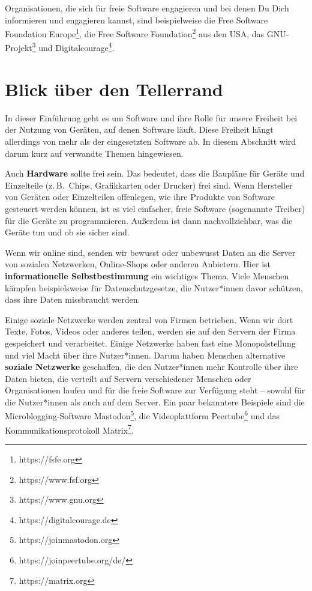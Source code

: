 \documentclass[a5paper,12pt]{scrartcl}
\begin{document}
Organisationen, die sich für freie Software engagieren und bei denen
Du Dich informieren und engagieren kannst, sind beispielweise die Free
Software Foundation Europe\footnote{https://fsfe.org}, die Free
Software Foundation\footnote{https://www.fsf.org} aus den USA, das
GNU-Projekt\footnote{https://www.gnu.org} und
Digitalcourage\footnote{https://digitalcourage.de}.


\section{Blick über den Tellerrand}

In dieser Einführung geht es um Software und ihre Rolle für unsere
Freiheit bei der Nutzung von Geräten, auf denen Software läuft. Diese
Freiheit hängt allerdings von mehr als der eingesetzten Software
ab. In diesem Abschnitt wird darum kurz auf verwandte Themen
hingewiesen.

Auch \textbf{Hardware} sollte frei sein. Das bedeutet, dass die
Baupläne für Geräte und Einzelteile (z.\,B.\ Chips, Grafikkarten oder
Drucker) frei sind. Wenn Hersteller von Geräten oder Einzelteilen
offenlegen, wie ihre Produkte von Software gesteuert werden können,
ist es viel einfacher, freie Software (sogenannte Treiber) für die
Geräte zu programmieren. Außerdem ist dann nachvollziehbar, was die
Geräte tun und ob sie sicher sind.

Wenn wir online sind, senden wir bewusst oder unbewusst Daten an die
Server von sozialen Netzwerken, Online-Shops oder anderen
Anbietern. Hier ist \textbf{informationelle Selbstbestimmung} ein
wichtiges Thema. Viele Menschen kämpfen beispielsweise für
Datenschutzgesetze, die Nutzer*innen davor schützen, dass ihre Daten
missbraucht werden.

Einige soziale Netzwerke werden zentral von Firmen betrieben. Wenn wir
dort Texte, Fotos, Videos oder anderes teilen, werden sie auf den
Servern der Firma gespeichert und verarbeitet. Einige Netzwerke haben
fast eine Monopolstellung und viel Macht über ihre Nutzer*innen. Darum
haben Menschen alternative \textbf{soziale Netzwerke} geschaffen, die
den Nutzer*innen mehr Kontrolle über ihre Daten bieten, die verteilt
auf Servern verschiedener Menschen oder Organisationen laufen und für
die freie Software zur Verfügung steht -- sowohl für die Nutzer*innen
als auch auf dem Server. Ein paar bekanntere Beispiele sind die
Microblogging-Software Mastodon\footnote{https://joinmastodon.org},
die Videoplattform Peertube\footnote{https://joinpeertube.org/de/} und
das Kommunikationsprotokoll Matrix\footnote{https://matrix.org}.
\end{document}
